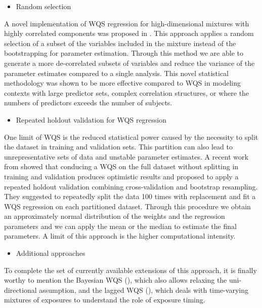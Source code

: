 \documentclass[
]{book}
\providecommand{\tightlist}{%
  \setlength{\itemsep}{0pt}\setlength{\parskip}{0pt}}
\begin{document}
\begin{itemize}
\tightlist
\item
  Random selection
\end{itemize}

A novel implementation of WQS regression for high-dimensional mixtures with highly correlated components was proposed in \citet{curtin2021random}. This approach applies a random selection of a subset of the variables included in the mixture instead of the bootstrapping for parameter estimation. Through this method we are able to generate a more de-correlated subsets of variables and reduce the variance of the parameter estimates compared to a single analysis. This novel statistical methodology was shown to be more effective compared to WQS in modeling contexts with large predictor sets, complex correlation structures, or where the numbers of predictors exceeds the number of subjects.

\begin{itemize}
\tightlist
\item
  Repeated holdout validation for WQS regression
\end{itemize}

One limit of WQS is the reduced statistical power caused by the necessity to split the dataset in training and validation sets. This partition can also lead to unrepresentative sets of data and unstable parameter estimates. A recent work from \citet{tanner2019repeated} showed that conducing a WQS on the full dataset without splitting in training and validation produces optimistic results and proposed to apply a repeated holdout validation combining cross-validation and bootstrap resampling. They suggested to repeatedly split the data 100 times with replacement and fit a WQS regression on each partitioned dataset. Through this procedure we obtain an approximately normal distribution of the weights and the regression parameters and we can apply the mean or the median to estimate the final parameters. A limit of this approach is the higher computational intensity.

\begin{itemize}
\tightlist
\item
  Additional approaches
\end{itemize}

To complete the set of currently available extensions of this approach, it is finally worthy to mention the Bayesian WQS (\citet{colicino2020per}), which also allows relaxing the uni-directional assumption, and the lagged WQS (\citet{gennings2020lagged}), which deals with time-varying mixtures of exposures to understand the role of exposure timing.
\end{document}
